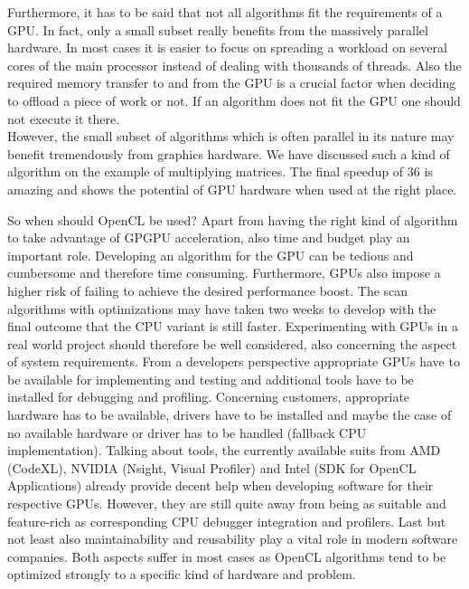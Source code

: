 Furthermore, it has to be said that not all algorithms fit the requirements of a GPU. In fact, only a small subset really benefits from the massively parallel hardware. In most cases it is easier to focus on spreading a workload on several cores of the main processor instead of dealing with thousands of threads. Also the required memory transfer to and from the GPU is a crucial factor when deciding to offload a piece of work or not. If an algorithm does not fit the GPU one should not execute it there. \\
However, the small subset of algorithms which is often parallel in its nature may benefit tremendously from graphics hardware. We have discussed such a kind of algorithm on the example of multiplying matrices. The final speedup of 36 is amazing and shows the potential of GPU hardware when used at the right place.

So when should OpenCL be used? Apart from having the right kind of algorithm to take advantage of GPGPU acceleration, also time and budget play an important role. Developing an algorithm for the GPU can be tedious and cumbersome and therefore time consuming. Furthermore, GPUs also impose a higher risk of failing to achieve the desired performance boost. The scan algorithms with optimizations may have taken two weeks to develop with the final outcome that the CPU variant is still faster. Experimenting with GPUs in a real world project should therefore be well considered, also concerning the aspect of system requirements. From a developers perspective appropriate GPUs have to be available for implementing and testing and additional tools have to be installed for debugging and profiling. Concerning customers, appropriate hardware has to be available, drivers have to be installed and maybe the case of no available hardware or driver has to be handled (fallback CPU implementation). Talking about tools, the currently available suits from AMD (CodeXL), NVIDIA (Nsight, Visual Profiler) and Intel (SDK for OpenCL Applications) already provide decent help when developing software for their respective GPUs. However, they are still quite away from being as suitable and feature-rich as corresponding CPU debugger integration and profilers. Last but not least also maintainability and reusability play a vital role in modern software companies. Both aspects suffer in most cases as OpenCL algorithms tend to be optimized strongly to a specific kind of hardware and problem.

